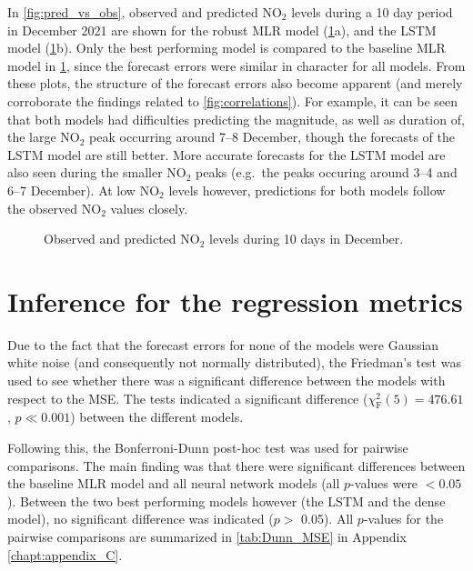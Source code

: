 \noindent
In \vref{fig:pred_vs_obs}, observed and predicted NO$_2$ levels during a 10 day period in December 2021 are shown for the robust MLR model (\cref{fig:pred_vs_obs}a), and the LSTM model (\cref{fig:pred_vs_obs}b). Only the best performing model is compared to the baseline MLR model in \cref{fig:pred_vs_obs}, since the forecast errors were similar in character for all models. From these plots, the structure of the forecast errors also become apparent (and merely corroborate the findings related to \cref{fig:correlations}). For example, it can be seen that both models had difficulties predicting the magnitude, as well as duration of, the large NO$_2$ peak occurring around 7--8 December, though the forecasts of the LSTM model are still better. More accurate forecasts for the LSTM model are also seen during the smaller NO$_2$ peaks (e.g.\ the peaks occuring around 3--4 and 6--7 December). At low NO$_2$ levels however, predictions for both models follow the observed NO$_2$ values closely. 


\begin{figure}[h] 
\begin{center}
\caption{Observed and predicted NO$_2$ levels during 10 days in December.}
\label{fig:pred_vs_obs}
\end{center}
\end{figure}

\section{Inference for the regression metrics}
\label{sec:inference}

Due to the fact that the forecast errors for none of the models were Gaussian white noise (and consequently not normally distributed), the Friedman's test was used to see whether there was a significant difference between the models with respect to the MSE. The tests indicated a significant difference ($\chi^2_{\text{F}}(5) = 476.61$, $p\ll0.001$) between the different models. 

Following this, the Bonferroni-Dunn post-hoc test was used for pairwise comparisons. The main finding was that there were significant differences between the baseline MLR model and all neural network models (all $p$-values were $<0.05$). Between the two best performing models however (the LSTM and the dense model), no significant difference was indicated ($p> $ 0.05). 
All $p$-values for the pairwise comparisons are summarized in \cref{tab:Dunn_MSE} in Appendix \ref{chapt:appendix_C}. 

